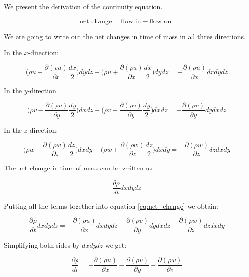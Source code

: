 
We present the derivation of the continuity equation.


\begin{equation} \label{eq:net_change}
\text{net change} = \text{flow in} - \text{flow out}
\end{equation}

We are going to write out the net changes in time of mass in all three directions.

In the $x$-direction:

\begin{equation}
\Big( \rho u - \frac{\partial (\rho u)}{\partial x} \frac{dx}{2} \Big) dy dz - \Big( \rho u + \frac{\partial (\rho u)}{\partial x} \frac{dx}{2} \Big) dy dz = - \frac{\partial (\rho u)}{\partial x} dx dy dz
\end{equation}

In the $y$-direction:

\begin{equation}
\Big( \rho v - \frac{\partial (\rho v)}{\partial y} \frac{dy}{2} \Big) dx dz - \Big( \rho v + \frac{\partial (\rho v)}{\partial y} \frac{dy}{2} \Big) dx dz = - \frac{\partial (\rho v)}{\partial y} dy dx dz
\end{equation}

In the $z$-direction:

\begin{equation}
\Big( \rho w - \frac{\partial (\rho w)}{\partial z} \frac{dz}{2} \Big) dx dy - \Big( \rho w + \frac{\partial (\rho w)}{\partial z} \frac{dz}{2} \Big) dx dy = - \frac{\partial (\rho w)}{\partial z} dz dx dy
\end{equation}

The net change in time of mass can be written as:

\begin{equation}
\frac{\partial \rho}{dt} dx dy dz
\end{equation}

Putting all the terms together into equation \ref{eq:net_change} we obtain:

\begin{equation}
\frac{\partial \rho}{dt} dx dy dz = - \frac{\partial (\rho u)}{\partial x} dx dy dz - \frac{\partial (\rho v)}{\partial y} dy dx dz - \frac{\partial (\rho w)}{\partial z} dz dx dy
\end{equation}

Simplifying both sides by $dx dy dz$ we get:

\begin{equation} \label{eq:continuity_general}
\frac{\partial \rho}{dt} = - \frac{\partial (\rho u)}{\partial x} - \frac{\partial (\rho v)}{\partial y} - \frac{\partial (\rho w)}{\partial z}
\end{equation}

